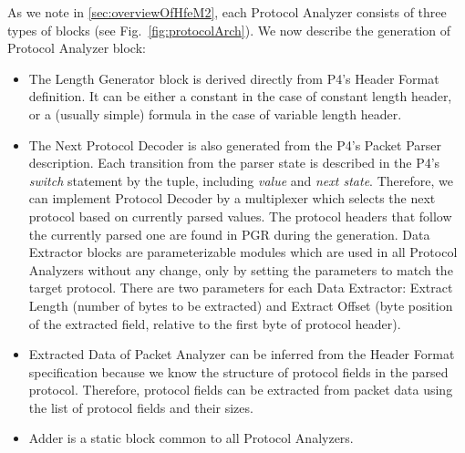 As we note in \ref{sec:overviewOfHfeM2}, each Protocol Analyzer consists of three types of blocks (see Fig.~\ref{fig:protocolArch}). 
We now describe the generation of Protocol Analyzer block:
\begin{itemize}
\item The Length Generator block is derived directly from P4's Header Format definition. 
It can be either a constant in the case of constant length header, or a (usually simple) formula in the case of variable length header.
\item The Next Protocol Decoder is also generated from the P4's Packet Parser description. Each transition from the parser state is described
in the P4's \textit{switch} statement by the tuple, including \textit{value} and \textit{next state}. 
Therefore, we can implement Protocol Decoder by a multiplexer which selects the next protocol based on currently parsed values. 
The protocol headers that follow the currently parsed one are found in PGR during the generation.
Data Extractor blocks are parameterizable modules which are used in all Protocol Analyzers without any change, 
only by setting the parameters to match the target protocol. 
There are two parameters for each Data Extractor: Extract Length (number of bytes to be extracted) and 
Extract Offset (byte position of the extracted field, relative to the first byte of protocol header).
\item Extracted Data of Packet Analyzer can be inferred from the Header Format specification because we know the structure of protocol fields 
in the parsed protocol.
Therefore, protocol fields can be extracted from packet data using the list of protocol fields and their sizes. 
\item Adder is a static block common to all Protocol Analyzers. 
\end{itemize}

